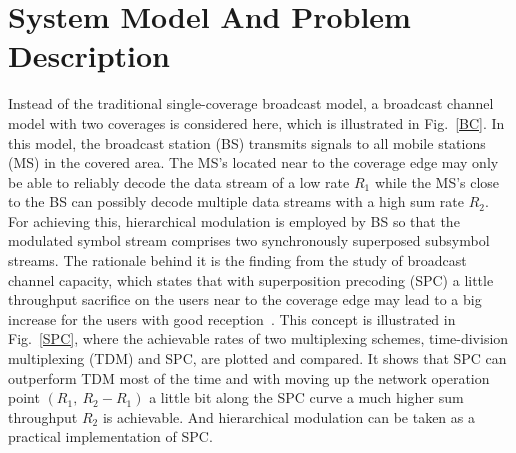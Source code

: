 \documentclass[conference]{IEEEtran}
\begin{document}
\section{System Model And Problem Description}
\begin{figure}
\end{figure}
Instead of the traditional single-coverage broadcast model, a
broadcast channel model with two coverages is considered here,
which is illustrated in Fig.~\ref{BC}. In this model, the
broadcast station (BS) transmits signals to all mobile stations
(MS) in the covered area. The MS's located near to the coverage
edge may only be able to reliably decode the data stream of a low
rate $R_1$ while the MS's close to the BS can possibly decode
multiple data streams with a high sum rate $R_2$. For achieving
this, hierarchical modulation is employed by BS so that the
modulated symbol stream comprises two synchronously superposed
subsymbol streams. The rationale behind it is the finding from the
study of broadcast channel capacity, which states that with
superposition precoding (SPC) a little throughput sacrifice on the
users near to the coverage edge may lead to a big increase for the
users with good reception~\cite{Cover72}. This concept is
illustrated in Fig.~\ref{SPC}, where the achievable rates of two
multiplexing schemes, time-division multiplexing (TDM) and SPC,
are plotted and compared. It shows that SPC can outperform TDM
most of the time and with moving up the network operation point
$(R_1,\ R_{2}-R_{1})$ a little bit along the SPC curve a much
higher sum throughput $R_{2}$ is achievable. And hierarchical
modulation can be taken as a practical implementation of SPC.
\begin{figure}
\end{figure}
\end{document}
